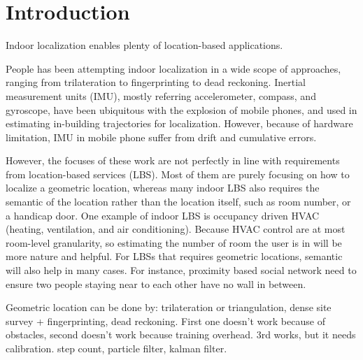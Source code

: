 \section{Introduction}
\label{sec:intro}


Indoor localization enables plenty of location-based applications. 




People has been attempting indoor localization in a wide scope of approaches, ranging from 
trilateration to fingerprinting to dead reckoning. Inertial measurement units (IMU), 
mostly referring accelerometer, 
compass, and gyroscope, have been ubiquitous with the explosion of mobile phones, and used in
estimating in-building trajectories for localization. However, because of hardware limitation, 
IMU in mobile phone suffer from drift and cumulative errors. 



However, the focuses of these work are not perfectly in line with requirements from location-based services (LBS). 
Most of them are purely focusing on how to localize a geometric location, whereas 
many indoor LBS also requires the semantic of the location rather than the location itself, such as room number,
or a handicap door.  
One example of indoor LBS is occupancy driven HVAC (heating, ventilation, and air conditioning).
Because HVAC control are at most room-level granularity, so estimating the number of room the 
user is in will be more nature and helpful. For LBSs that requires geometric locations, semantic will also help
in many cases. For instance, proximity based social network \fxnote{[cite]} need to ensure two people staying near
to each other have no wall in between. 



Geometric location can be done by: trilateration or triangulation, dense site survey + fingerprinting, dead reckoning.
First one doesn't work because of obstacles, second doesn't work because training overhead. 3rd works, but it needs calibration. 
step count, particle filter, kalman filter.



